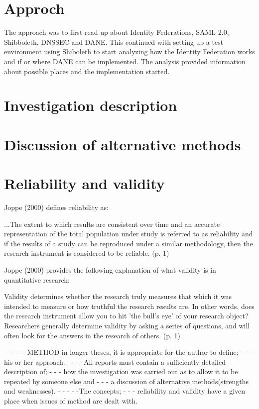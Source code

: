 \section{Approch}

The approach was to first read up about Identity Federations, SAML 2.0, Shibboleth, DNSSEC and DANE. This continued with setting up a test environment using Shiboleth to start analyzing how the Identity Federation works and if or where DANE can be implemented. The analysis provided information about possible places and the implementation started.  

\section{Investigation description}


\section{Discussion of alternative methods}


\section{Reliability and validity}


Joppe (2000) defines reliability as:


...The extent to which results are consistent over time and an accurate representation of
the total population under study is referred to as reliability and if the results of a study
can be reproduced under a similar methodology, then the research instrument is
considered to be reliable. (p. 1)




Joppe (2000) provides the following explanation of what validity is in quantitative
research:


Validity determines whether the research truly measures that which it was intended to
measure or how truthful the research results are. In other words, does the research
instrument allow you to hit 'the bull's eye' of your research object? Researchers
generally determine validity by asking a series of questions, and will often look for the
answers in the research of others. (p. 1)



-
-
-
-
-
METHOD in longer theses, it is appropriate for the author to define; 
-
-
- his or her approach.
-
-
- 
-All reports must contain a sufficiently detailed description of; 
-
-
- how the investigation was carried out as to allow it to be repeated by someone else and 
-
-
- a discussion of alternative methods(strengths and weaknesses). 
-
-
-
-
-The concepts; 
-
-
- reliability and validity have a given place when issues of method are dealt with.




